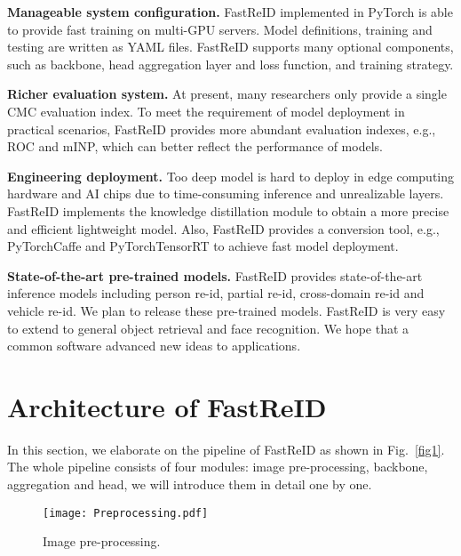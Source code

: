 \documentclass[10pt,twocolumn,letterpaper]{article}
\begin{document}
\noindent\textbf{Manageable system configuration.} FastReID implemented in PyTorch is able to provide fast training on multi-GPU servers. Model definitions, training and testing are written as YAML files. FastReID supports many optional components, such as backbone, head aggregation layer and loss function, and training strategy.

\noindent\textbf{Richer evaluation system.} At present, many researchers only provide a single CMC evaluation index. To meet the requirement of model deployment in practical scenarios, FastReID provides more abundant evaluation indexes, e.g., ROC and mINP, which can better reflect the performance of models.

\noindent\textbf{Engineering deployment.} Too deep model is hard to deploy in edge computing hardware and AI chips due to time-consuming inference and unrealizable layers. FastReID implements the knowledge distillation module to obtain a more precise and efficient lightweight model. Also, FastReID provides a conversion tool, e.g., PyTorchCaffe and PyTorchTensorRT to achieve fast model deployment.


\noindent\textbf{State-of-the-art pre-trained models.} FastReID provides state-of-the-art inference models including person re-id, partial re-id, cross-domain re-id and vehicle re-id. We plan to release these pre-trained models. FastReID is very easy to extend to general object retrieval and face recognition. We hope that a common software advanced new ideas to applications.

\section{Architecture of FastReID}

In this section, we elaborate on the pipeline of FastReID as shown in Fig.~\ref{fig1}. The whole pipeline consists of four modules: image pre-processing, backbone, aggregation and head, we will introduce them in detail one by one. 


\begin{figure}[t]
    \centering
       \vspace{0em}
    \texttt{[image: Preprocessing.pdf]}
     \caption{Image pre-processing.}\label{fig2}
    \vspace{-1em}
\end{figure}
\end{document}
